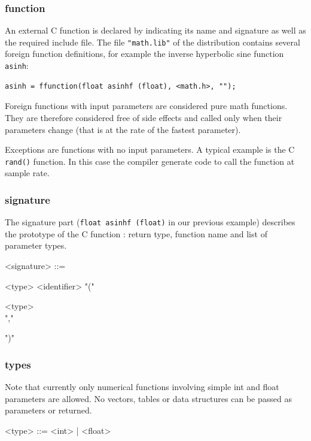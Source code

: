 \documentclass[a4paper]{book}
\begin{document}
\subsubsection{function} An external C function is declared by indicating its name and signature as well as the required include file.
The file \lstinline'"math.lib"' of the \faust distribution contains several foreign function definitions, for example the inverse hyperbolic sine function \lstinline'asinh':

\begin{lstlisting}
asinh = ffunction(float asinhf (float), <math.h>, "");
\end{lstlisting}

Foreign functions with input parameters are considered pure math functions. They are therefore considered free of side effects and called only when their parameters change (that is at the rate of the fastest parameter). 

Exceptions are functions with no input parameters. A typical example is the C \lstinline'rand()' function. In this case the compiler generate code to call the function at sample rate.


\subsubsection{signature} 
The signature part (\lstinline'float asinhf (float)' in our previous example) describes the prototype of the C function : return type, function name and list of parameter types. 

\begin{grammar}
  <signature> ::= 
  \begin{syntdiag}
    <type> <identifier> "("
    \begin{rep}
      <type> \\ ","
    \end{rep}
    ")"
  \end{syntdiag}
\end{grammar}

\subsubsection{types}
Note that currently only numerical functions involving simple int and float parameters are allowed. No vectors, tables or data structures can be passed as parameters or returned.

\begin{grammar}
  <type> ::= 
      <int> | <float>
\end{grammar}
\end{document}
